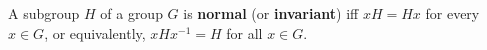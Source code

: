 A subgroup $H$ of a group $G$ is \textbf{normal} (or \textbf{invariant}) iff $xH = Hx$ for every $x \in G$, or equivalently, $xHx^{-1} = H$ for all $x \in G$.
